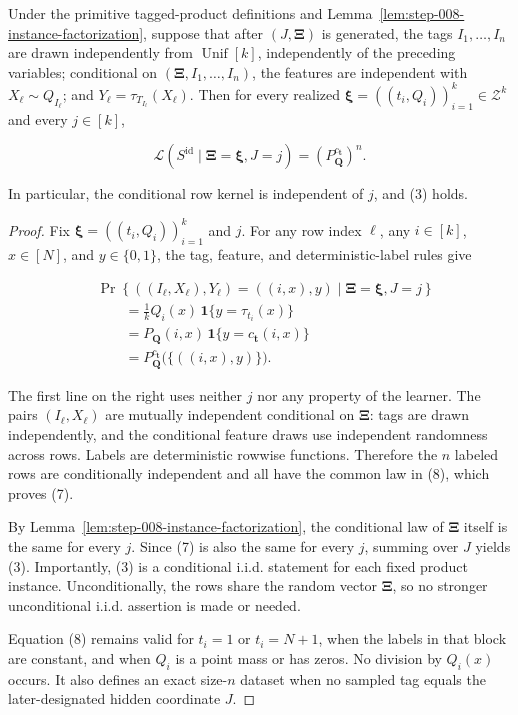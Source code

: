 \begin{lemma}\label{lem:step-008-ideal-sample-law}
Under the primitive tagged-product definitions and
Lemma~\ref{lem:step-008-instance-factorization}, suppose that after
\((J,\boldsymbol\Xi)\) is generated, the tags
\(I_1,\ldots,I_n\) are drawn independently from
\(\operatorname{Unif}[k]\), independently of the preceding variables;
conditional on \((\boldsymbol\Xi,I_1,\ldots,I_n)\), the features are
independent with \(X_\ell\sim Q_{I_\ell}\); and
\(Y_\ell=\tau_{T_{I_\ell}}(X_\ell)\). Then for every realized
\(\boldsymbol\xi=((t_i,Q_i))_{i=1}^k\in\mathcal Z^k\) and every
\(j\in[k]\),

\[
\mathcal L\!\left(S^{\mathrm{id}}\mid
  \boldsymbol\Xi=\boldsymbol\xi,J=j\right)
=\left(P_{\boldsymbol Q}^{c_{\boldsymbol t}}\right)^n.
\tag{7}
\]

In particular, the conditional row kernel is independent of \(j\), and (3)
holds.
\end{lemma}

\begin{proof}
Fix \(\boldsymbol\xi=((t_i,Q_i))_{i=1}^k\) and \(j\). For any row index
\(\ell\), any \(i\in[k]\), \(x\in[N]\), and \(y\in\{0,1\}\), the tag,
feature, and deterministic-label rules give

\[
\begin{aligned}
&\Pr\left\{((I_\ell,X_\ell),Y_\ell)=((i,x),y)
  \mid\boldsymbol\Xi=\boldsymbol\xi,J=j\right\}\\
&\qquad=\frac1k Q_i(x)\,
  \mathbf1\{y=\tau_{t_i}(x)\}\\
&\qquad=P_{\boldsymbol Q}(i,x)\,
  \mathbf1\{y=c_{\boldsymbol t}(i,x)\}\\
&\qquad=P_{\boldsymbol Q}^{c_{\boldsymbol t}}
  \bigl(\{((i,x),y)\}\bigr).
\end{aligned}
\tag{8}
\]

The first line on the right uses neither \(j\) nor any property of the
learner. The pairs \((I_\ell,X_\ell)\) are mutually independent conditional
on \(\boldsymbol\Xi\): tags are drawn independently, and the conditional
feature draws use independent randomness across rows. Labels are
deterministic rowwise functions. Therefore the \(n\) labeled rows are
conditionally independent and all have the common law in (8), which proves
(7).

By Lemma~\ref{lem:step-008-instance-factorization}, the conditional law of
\(\boldsymbol\Xi\) itself is the same for every \(j\). Since (7) is also the
same for every \(j\), summing over \(J\) yields (3). Importantly, (3) is a
conditional i.i.d. statement for each fixed product instance. Unconditionally,
the rows share the random vector \(\boldsymbol\Xi\), so no stronger
unconditional i.i.d. assertion is made or needed.

Equation (8) remains valid for \(t_i=1\) or \(t_i=N+1\), when the labels in
that block are constant, and when \(Q_i\) is a point mass or has zeros. No
division by \(Q_i(x)\) occurs. It also defines an exact size-\(n\) dataset
when no sampled tag equals the later-designated hidden coordinate \(J\).
\end{proof}

